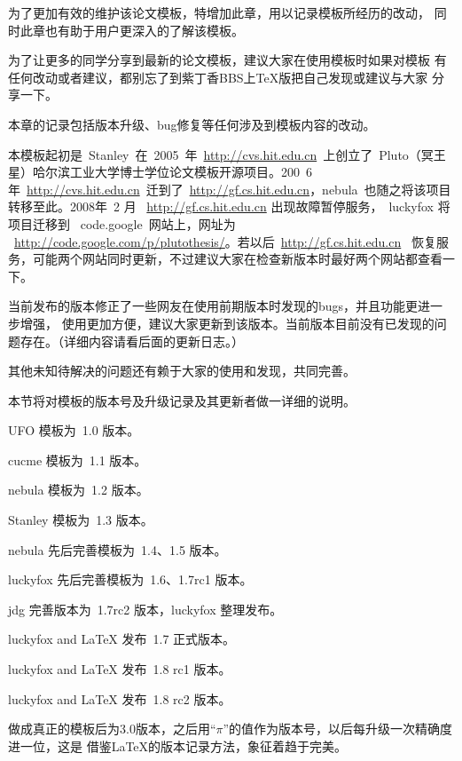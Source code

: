
\label{Updatelog}

\label{Update:intro}
为了更加有效的维护该论文模板，特增加此章，用以记录模板所经历的改动，
同时此章也有助于用户更深入的了解该模板。

为了让更多的同学分享到最新的论文模板，建议大家在使用模板时如果对模板
有任何改动或者建议，都别忘了到紫丁香BBS上TeX版把自己发现或建议与大家
分享一下。

本章的记录包括版本升级、bug修复等任何涉及到模板内容的改动。

本模板起初是~Stanley~在~2005~年~\url{http://cvs.hit.edu.cn}~上创立了~Pluto（冥王星）哈尔滨工业大学博士学位论文模板开源项目。200~6年~\url{http://cvs.hit.edu.cn}~迁到了~\url{http://gf.cs.hit.edu.cn}，nebula~也随之将该项目转移至此。2008年~2 月  ~\url{http://gf.cs.hit.edu.cn} 出现故障暂停服务，~luckyfox 将项目迁移到~ code.google~网站上，网址为 ~\url{http://code.google.com/p/plutothesis/}。若以后~\url{http://gf.cs.hit.edu.cn}~ 恢复服务，可能两个网站同时更新，不过建议大家在检查新版本时最好两个网站都查看一下。


当前发布的版本修正了一些网友在使用前期版本时发现的bugs，并且功能更进一步增强，
使用更加方便，建议大家更新到该版本。当前版本目前没有已发现的问题存在。（详细内容请看后面的更新日志。）

其他未知待解决的问题还有赖于大家的使用和发现，共同完善。

本节将对模板的版本号及升级记录及其更新者做一详细的说明。

\begin{hitlist}
\item UFO 模板为~1.0 版本。
\item cucme 模板为~1.1 版本。
\item nebula 模板为~1.2 版本。
\item Stanley 模板为~1.3 版本。
\item nebula 先后完善模板为~1.4、1.5 版本。
\item luckyfox 先后完善模板为~1.6、1.7rc1 版本。
\item jdg 完善版本为~1.7rc2 版本，luckyfox 整理发布。
\item luckyfox and LaTeX 发布~1.7 正式版本。
\item luckyfox and LaTeX 发布~1.8 rc1 版本。
\item luckyfox and LaTeX 发布~1.8 rc2 版本。
\item 做成真正的模板后为3.0版本，之后用``$\pi$''的值作为版本号，以后每升级一次精确度进一位，这是
借鉴\LaTeX{}的版本记录方法，象征着趋于完美。
\end{hitlist}

